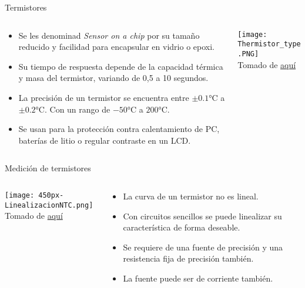 \documentclass[aspectratio=169]{beamer}
\begin{document}
\begin{frame}{Termistores}
    \begin{columns}[c, onlytextwidth]
        \begin{column}{0.55\textwidth}
            \begin{itemize}
                \item Se les denominad \textit{Sensor on a chip} por su tamaño reducido y facilidad para encapsular en vidrio o epoxi.
                \item Su tiempo de respuesta depende de la capacidad térmica y masa del termistor, variando de 0,5 a 10 segundos.  
                \item La precisión de un termistor se encuentra entre $\pm 0.1 {\si{\celsius}}$ a $\pm 0.2 {\si{\celsius}}$. Con un rango de $-50 {\si{\celsius}}$ a $200 {\si{\celsius}}$.
                \item Se usan para la protección contra calentamiento de PC, baterías de litio o regular contraste en un LCD. 
            \end{itemize}
        \end{column}
        \begin{column}{0.40\textwidth}
           \texttt{[image: Thermistor\_type.PNG]}
            \\ \tiny{Tomado de \href{https://es.made-in-china.com/co_jpsensor/product_Ntc-10K-Thermistor-Collection_reeeohegg.html}{aquí}}
        \end{column}
    \end{columns}
\end{frame}
\begin{frame}{Medición de termistores}
    \begin{columns}[c, onlytextwidth]
            \begin{column}{0.5\textwidth}
           \texttt{[image: 450px-LinealizacionNTC.png]}
            \\ \tiny{Tomado de \href{https://es.made-in-china.com/co_jpsensor/product_Ntc-10K-Thermistor-Collection_reeeohegg.html}{aquí}}
        \end{column}
        
        \begin{column}{0.45\textwidth}
            \begin{itemize}
                \item La curva de un termistor no es lineal. 
                \item Con circuitos sencillos se puede linealizar su característica de forma deseable.
                \item Se requiere de una fuente de precisión y una resistencia fija de precisión también.
                \item La fuente puede ser de corriente también.
            \end{itemize}
        \end{column}

    \end{columns}
\end{frame}
\end{document}
